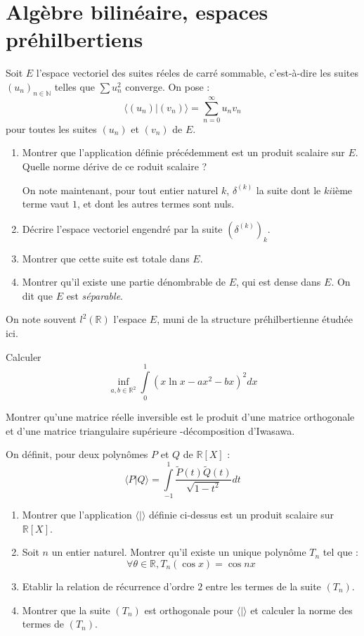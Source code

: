 \section{Alg\`ebre bilin\'eaire, espaces pr\'ehilbertiens}

\begin{exer}
Soit $E$ l'espace vectoriel des suites r\'eeles de carr\'e sommable, c'est-\`a-dire les suites $(u_n)_{n\in\mathbb{N}}$ telles que $\sum u_n^2$ converge. %
On pose : \[\langle(u_n)|(v_n)\rangle =\sum\limits_{n=0}^{\infty} u_n v_n\]
pour toutes les suites $(u_n)$ et $(v_n)$ de $E$.
\begin{enumerate}
\item Montrer que l'application d\'efinie pr\'ec\'edemment est un produit scalaire sur $E$. Quelle norme d\'erive de ce roduit scalaire ?

\smallskip
On note maintenant, pour tout entier naturel $k$, $\delta^{(k)}$ la suite dont le $ki$i\`eme terme vaut $1$, et dont les autres termes sont nuls.
\item D\'ecrire l'espace vectoriel engendr\'e par la suite $(\delta^{(k)})_k$.
\item Montrer que cette suite est totale dans $E$.
\item Montrer qu'il existe une partie d\'enombrable de $E$, qui est dense dans $E$. On dit que $E$ est \textit{s\'eparable}.
\end{enumerate}
On note souvent $l^2(\mathbb{R})$ l'espace $E$, muni de la structure pr\'ehilbertienne \'etud\i\'ee ici.
\end{exer}

\begin{exer}
Calculer \[\underset{a,b\in\mathbb{R}^2}{\inf}\int\limits_0^1(x\ln x -ax^2-bx)^2 dx\]
\end{exer}

\begin{exer}
Montrer qu'une matrice réelle inversible est le produit d'une matrice orthogonale et d'une matrice triangulaire supérieure %
-décomposition d'Iwasawa.
\end{exer}

\begin{exer}
On d\'efinit, pour deux polyn\^omes $P$ et $Q$ de $\mathbb{R}[X]$ :
\[\langle P|Q \rangle =\int\limits_{-1}^1 \frac{\tilde{P}(t)\tilde{Q}(t)}{\sqrt{1-t^2}}dt\]
\begin{enumerate}
\item Montrer que l'application $\langle |\rangle$ d\'efinie ci-dessus est un produit scalaire sur $\mathbb{R}[X]$.
\item Soit $n$ un entier naturel. Montrer qu'il existe un unique polyn\^ome $T_n$ tel que :
\[\forall\theta\in\mathbb{R} , T_n(\cos x)=\cos nx\]
\item Etablir la relation de r\'ecurrence d'ordre $2$ entre les termes de la suite $(T_n)$.
\item Montrer que la suite $(T_n)$ est orthogonale pour $\langle |\rangle$ et calculer la norme des termes de $(T_n)$.
\end{enumerate}
\end{exer}

